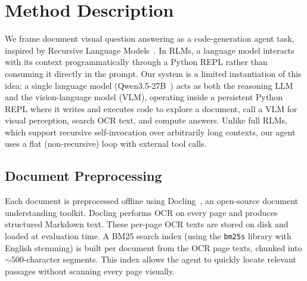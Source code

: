 \documentclass[10pt,twocolumn]{article}
\begin{document}

\renewcommand{\thefootnote}{\fnsymbol{footnote}}
\renewcommand{\thefootnote}{\arabic{footnote}}

\section{Method Description}

We frame document visual question answering as a code-generation agent task, inspired by Recursive Language Models~\cite{zhang2025rlm}. In RLMs, a language model interacts with its context programmatically through a Python REPL rather than consuming it directly in the prompt. Our system is a limited instantiation of this idea: a single language model (Qwen3.5-27B~\cite{qwen2026}) acts as both the reasoning LLM and the vision-language model (VLM), operating inside a persistent Python REPL where it writes and executes code to explore a document, call a VLM for visual perception, search OCR text, and compute answers. Unlike full RLMs, which support recursive self-invocation over arbitrarily long contexts, our agent uses a flat (non-recursive) loop with external tool calls.

\subsection{Document Preprocessing}

Each document is preprocessed offline using Docling~\cite{docling2024}, an open-source document understanding toolkit. Docling performs OCR on every page and produces structured Markdown text. These per-page OCR texts are stored on disk and loaded at evaluation time. A BM25 search index (using the \texttt{bm25s} library with English stemming) is built per document from the OCR page texts, chunked into ${\sim}500$-character segments. This index allows the agent to quickly locate relevant passages without scanning every page visually.
\end{document}
